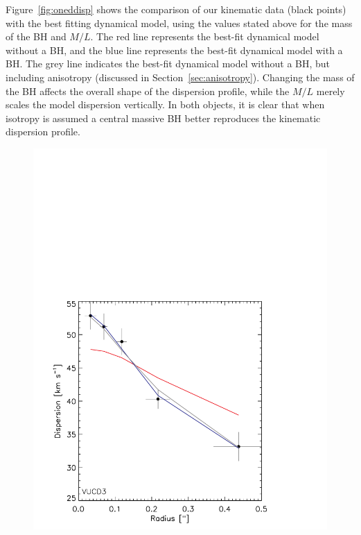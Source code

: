 \documentclass{aastex}
\begin{document}
Figure~\ref{fig:oneddisp} shows the comparison of our kinematic data (black points) with the best fitting dynamical model, using the values stated above for the mass of the BH and $M/L$. The red line represents the best-fit dynamical model without a BH, and the blue line represents the best-fit dynamical model with a BH. The grey line indicates the best-fit dynamical model without a BH, but including anisotropy (discussed in Section~\ref{sec:anisotropy}). Changing the mass of the BH affects the overall shape of the dispersion profile, while the $M/L$ merely scales the model dispersion vertically. In both objects, it is clear that when isotropy is assumed a central massive BH better reproduces the kinematic dispersion profile.
\begin{figure}[ht!]
  \centering
  \begin{minipage}{0.48\textwidth}
    \includegraphics[trim={0 0 0 10cm},clip,scale=0.5]{vucd3_onedbestfit.pdf}%
  \end{minipage}
  \begin{minipage}{0.48\textwidth}

\end{minipage}
\end{figure}
\end{document}
